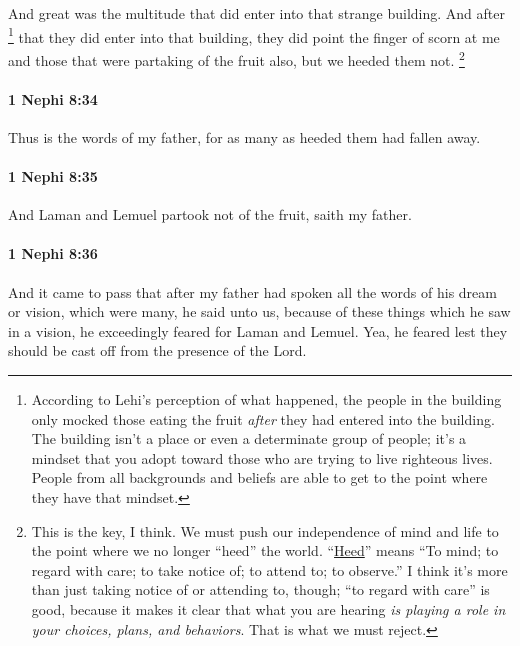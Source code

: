 			And great was the multitude that did enter into that strange building.
			And after%
				\footnote{%
					\label{1NEPHI-8-33-NOTE-after}%
					According to Lehi's perception of what happened, the people in the building only mocked those eating the fruit \textit{after} they had entered into the building. The building isn't a place or even a determinate group of people; it's a mindset that you adopt toward those who are trying to live righteous lives. People from all backgrounds and beliefs are able to get to the point where they have that mindset.
					}
			that they did enter into that building,
			they did point the finger of scorn at me
			and those that were partaking of the fruit also,
			but we heeded them not.%
				\footnote{%
					\label{1NEPHI-8-33-NOTE-heeded-not}%
					This is the key, I think. We must push our independence of mind and life to the point where we no longer ``heed'' the world. ``\hyperref[HEED-1828]{Heed}'' means ``To mind; to regard with care; to take notice of; to attend to; to observe.'' I think it's more than just taking notice of or attending to, though; ``to regard with care'' is good, because it makes it clear that what you are hearing \textit{is playing a role in your choices, plans, and behaviors}. That is what we must reject.
					}

		\paragraph{1 Nephi 8:34} %
			\label{1NEPHI-8-34}

			Thus is the words of my father,
			for as many as heeded them had fallen away.

		\paragraph{1 Nephi 8:35} %
			\label{1NEPHI-8-35}

			And Laman and Lemuel partook not of the fruit, saith my father.

		\paragraph{1 Nephi 8:36} %
			\label{1NEPHI-8-36}

			And it came to pass that after my father had spoken
			all the words of his dream or vision, which were many,
			he said unto us,
			because of these things which he saw in a vision,
			he exceedingly feared for Laman and Lemuel.
			Yea, he feared lest they should be cast off from the presence of the Lord.

